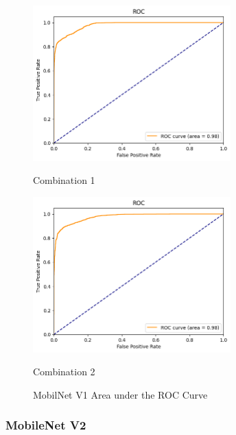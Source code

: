 \begin{figure}[H]
    \centering
    \begin{minipage}[b]{0.49\textwidth}
        \centering
        \includegraphics[width=\textwidth, height=6cm]{Figures/balanced_data/more_data/withoutbn/mn1/roc.png}
        \captionsetup{labelformat=empty}
        \caption{Combination 1}
        \label{fig:u_wo_r_roc}
    \end{minipage}
    \hfill
    \begin{minipage}[b]{0.49\textwidth}
        \centering
        \includegraphics[width=\textwidth, height=6cm]{Figures/balanced_data/more_data/withbn/mn1/roc.png}
        \captionsetup{labelformat=empty}
        \caption{Combination 2}
        \label{fig:u_w_r_roc}
    \end{minipage}
    \captionsetup{labelformat=default}
    \caption{MobilNet V1 Area under the ROC Curve}
\end{figure}

\subsubsection{MobileNet V2}

